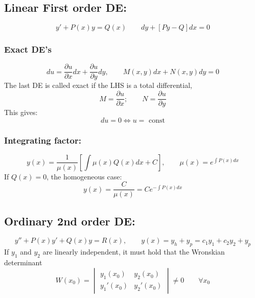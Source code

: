 \documentclass[a4paper,norsk, 10pt]{article}
\begin{document}
\subsection{Linear First order DE:}
\begin{equation}
y' + P(x)y = Q(x)\qquad dy + [Py - Q]dx = 0
\end{equation}
\subsubsection{Exact DE's}
\begin{equation}
du = \frac{\partial u}{\partial x} dx + \frac{\partial u}{\partial y}dy, \qquad M(x,y)dx + N(x,y)dy = 0
\end{equation}
The last DE is called exact if the LHS is a total differential,
\begin{equation}
M = \frac{\partial u}{\partial x}; \qquad N = \frac{\partial u}{\partial y}
\end{equation}
This gives:
\begin{equation}
du = 0 \Leftrightarrow u = \text{ const}
\end{equation}
\subsubsection{Integrating factor:}
\begin{equation}
y(x) = \frac{1}{\mu(x)}\left[\int \mu(x)Q(x)dx + C\right], \qquad \mu(x) = e^{\int P(x)dx}
\end{equation}
If $Q(x) = 0$, the homogeneous case:
\begin{equation}
y(x) = \frac{C}{\mu(x)}=Ce^{-\int P(x)dx}
\end{equation}

\subsection{Ordinary 2nd order DE:}
\begin{equation}
y'' + P(x)y' + Q(x)y = R(x), \qquad y(x) = y_h + y_p = c_1y_1 + c_2y_2 + y_p
\end{equation}
If $y_1$ and $y_2$ are linearly independent, it must hold that the Wronskian determinant
\begin{equation}
W(x_0) = 
\begin{vmatrix}
y_1(x_0) & y_2(x_0)\\
y_1'(x_0) & y_2'(x_0)
\end{vmatrix}
\neq 0 \qquad \forall x_0
\end{equation}
\end{document}
